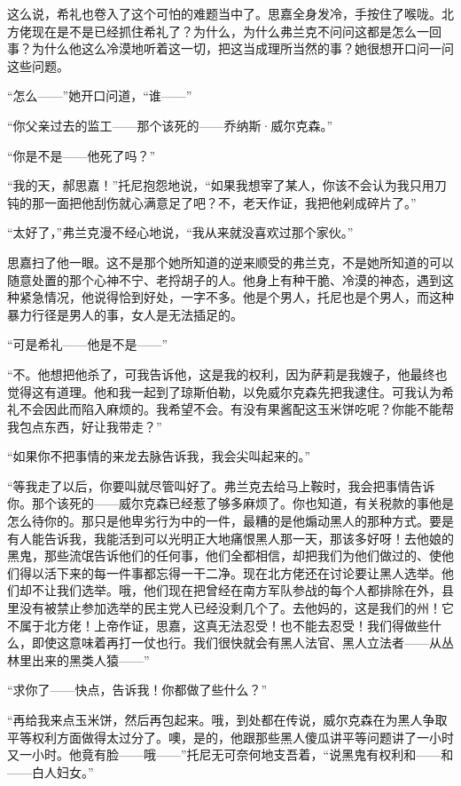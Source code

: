 \par 这么说，希礼也卷入了这个可怕的难题当中了。思嘉全身发冷，手按住了喉咙。北方佬现在是不是已经抓住希礼了？为什么，为什么弗兰克不问问这都是怎么一回事？为什么他这么冷漠地听着这一切，把这当成理所当然的事？她很想开口问一问这些问题。
\par “怎么——”她开口问道，“谁——”
\par “你父亲过去的监工——那个该死的——乔纳斯·威尔克森。”
\par “你是不是——他死了吗？”
\par “我的天，郝思嘉！”托尼抱怨地说，“如果我想宰了某人，你该不会认为我只用刀钝的那一面把他刮伤就心满意足了吧？不，老天作证，我把他剁成碎片了。”
\par “太好了，”弗兰克漫不经心地说，“我从来就没喜欢过那个家伙。”
\par 思嘉扫了他一眼。这不是那个她所知道的逆来顺受的弗兰克，不是她所知道的可以随意处置的那个心神不宁、老捋胡子的人。他身上有种干脆、冷漠的神态，遇到这种紧急情况，他说得恰到好处，一字不多。他是个男人，托尼也是个男人，而这种暴力行径是男人的事，女人是无法插足的。
\par “可是希礼——他是不是——”
\par “不。他想把他杀了，可我告诉他，这是我的权利，因为萨莉是我嫂子，他最终也觉得这有道理。他和我一起到了琼斯伯勒，以免威尔克森先把我逮住。可我认为希礼不会因此而陷入麻烦的。我希望不会。有没有果酱配这玉米饼吃呢？你能不能帮我包点东西，好让我带走？”
\par “如果你不把事情的来龙去脉告诉我，我会尖叫起来的。”
\par “等我走了以后，你要叫就尽管叫好了。弗兰克去给马上鞍时，我会把事情告诉你。那个该死的——威尔克森已经惹了够多麻烦了。你也知道，有关税款的事他是怎么待你的。那只是他卑劣行为中的一件，最糟的是他煽动黑人的那种方式。要是有人能告诉我，我能活到可以光明正大地痛恨黑人那一天，那该多好呀！去他娘的黑鬼，那些流氓告诉他们的任何事，他们全都相信，却把我们为他们做过的、使他们得以活下来的每一件事都忘得一干二净。现在北方佬还在讨论要让黑人选举。他们却不让我们选举。哦，他们现在把曾经在南方军队参战的每个人都排除在外，县里没有被禁止参加选举的民主党人已经没剩几个了。去他妈的，这是我们的州！它不属于北方佬！上帝作证，思嘉，这真无法忍受！也不能去忍受！我们得做些什么，即使这意味着再打一仗也行。我们很快就会有黑人法官、黑人立法者——从丛林里出来的黑类人猿——”
\par “求你了——快点，告诉我！你都做了些什么？”
\par “再给我来点玉米饼，然后再包起来。哦，到处都在传说，威尔克森在为黑人争取平等权利方面做得太过分了。噢，是的，他跟那些黑人傻瓜讲平等问题讲了一小时又一小时。他竟有脸——哦——”托尼无可奈何地支吾着，“说黑鬼有权利和——和——白人妇女。”
